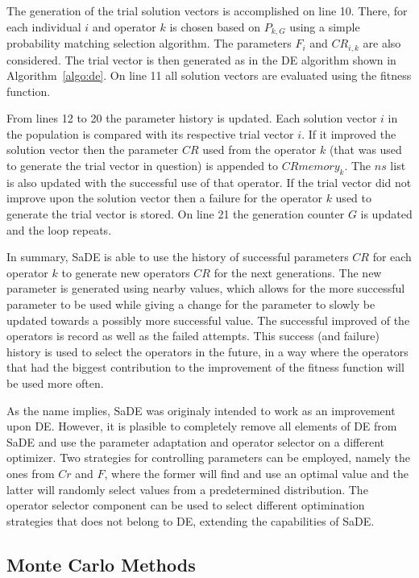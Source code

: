 The generation of the trial solution vectors is accomplished on line 10. There,
for each individual $i$ and operator $k$ is chosen based on $P_{k,G}$ using a
simple probability matching selection algorithm. The parameters
$F_i$ and $CR_{i,k}$ are also considered. The trial vector is then
generated as in the \ac{DE} algorithm shown in Algorithm~\ref{algo:de}. On line
11 all solution vectors are evaluated using the fitness function.

From lines 12 to 20 the parameter history is updated. Each
solution vector $i$ in the population is compared with its
respective trial vector $i$. If it improved the solution vector
then the parameter $CR$ used from the operator $k$
(that was used to generate the trial vector in question) is appended
to $CRmemory_k$. The $ns$ list is also updated with the successful use of
that operator. If the trial vector did not improve upon the solution vector
then a failure for the operator $k$ used to generate the trial vector is stored.
On line 21 the generation counter $G$ is updated and the loop repeats.

In summary, \ac{SaDE} is able to use the history of successful parameters $CR$
for each operator $k$ to generate new operators $CR$ for the next generations.
The new parameter is generated using nearby values, which allows for the
more successful parameter to be used while giving a change for the
parameter to slowly be updated towards a possibly more successful value.
The successful improved of the operators is record as well as the failed
attempts. This success (and failure) history is used to select the operators
in the future, in a way where the operators that had the biggest
contribution to the improvement of the fitness function will be used more often.

As the name implies, \ac{SaDE} was originaly intended to work as an improvement upon
\ac{DE}. However, it is plasible to completely remove all elements of \ac{DE} from
\ac{SaDE} and use the parameter adaptation and operator selector on a different
optimizer. Two strategies for controlling parameters can be employed, namely the
ones from $Cr$ and $F$, where the former will find and use an optimal value and
the latter will randomly select values from a predetermined distribution. The
operator selector component can be used to select different optimination strategies
that does not belong to \ac{DE}, extending the capabilities of \ac{SaDE}.

\subsection{Monte Carlo Methods} \label{sec:monte-carlo-methods}

